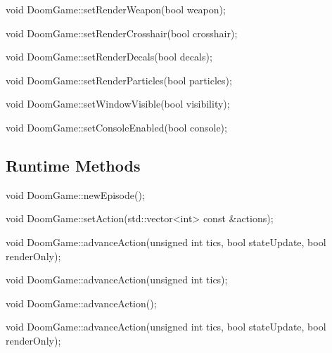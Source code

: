 \begin{clinee}  
void DoomGame::setRenderWeapon(bool weapon);
\end{clinee}


\begin{clinee}  
void DoomGame::setRenderCrosshair(bool crosshair);
\end{clinee}


\begin{clinee}  
void DoomGame::setRenderDecals(bool decals);
\end{clinee}


\begin{clinee}  
void DoomGame::setRenderParticles(bool particles);
\end{clinee}


\begin{clinee}
void DoomGame::setWindowVisible(bool visibility);
\end{clinee}


\begin{clinee}
void DoomGame::setConsoleEnabled(bool console);
\end{clinee}
	

\subsection{Runtime Methods}\label{subsec:runtime_methods}
	

\begin{clinee}
void DoomGame::newEpisode();
\end{clinee}


\begin{clinee}
	void DoomGame::setAction(std::vector<int> const &actions);
\end{clinee}


\begin{clinee}
	void DoomGame::advanceAction(unsigned int tics, bool stateUpdate, bool renderOnly);
\end{clinee}


\begin{clinee}
	void DoomGame::advanceAction(unsigned int tics);
\end{clinee}


\begin{clinee}
	void DoomGame::advanceAction();
\end{clinee}


\begin{clinee}
	void DoomGame::advanceAction(unsigned int tics, bool stateUpdate, bool renderOnly);
\end{clinee}


